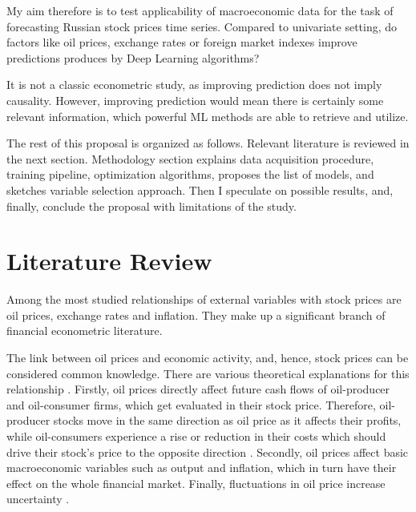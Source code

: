 \documentclass{elsarticle}
\begin{document}

My aim therefore is to test applicability of macroeconomic data for the task of forecasting Russian stock prices time series. Compared to univariate setting, do factors like oil prices, exchange rates or foreign market indexes improve predictions produces by Deep Learning algorithms?

It is not a classic econometric study, as improving prediction does not imply causality. However, improving prediction would mean there is certainly some relevant information, which powerful ML methods are able to retrieve and utilize.

The rest of this proposal is organized as follows. Relevant literature is reviewed in the next section. Methodology section explains data acquisition procedure, training pipeline, optimization algorithms, proposes the list of models, and sketches variable selection approach. Then I speculate on possible results, and, finally, conclude the proposal with limitations of the study.

\section{Literature Review}

Among the most studied relationships of external variables with stock prices are oil prices, exchange rates and inflation. They make up a significant branch of financial econometric literature.

The link between oil prices and economic activity, and, hence, stock prices can be considered common knowledge. There are various theoretical explanations for this relationship \citep{degiannakis_oil_2018}.
Firstly, oil prices directly affect future cash flows of oil-producer and oil-consumer firms, which get evaluated in their stock price. Therefore, oil-producer stocks move in the same direction as oil price as it affects their profits, while oil-consumers experience a rise or reduction in their costs which should drive their stock's price to the opposite direction \citep{basher_oil_2006, filis_dynamic_2011}.
Secondly, oil prices affect basic macroeconomic variables such as output and inflation, which in turn have their effect on the whole financial market.
Finally, fluctuations in oil price increase uncertainty \citep{brown_energy_2002}.
\end{document}
